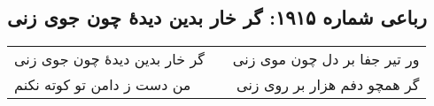 \begin{center}
\section*{رباعی شماره ۱۹۱۵: گر خار بدین دیدهٔ چون جوی زنی}
\label{sec:1915}
\begin{longtable}{l p{0.5cm} r}
گر خار بدین دیدهٔ چون جوی زنی
&&
ور تیر جفا بر دل چون موی زنی
\\
من دست ز دامن تو کوته نکنم
&&
گر همچو دفم هزار بر روی زنی
\\
\end{longtable}
\end{center}
